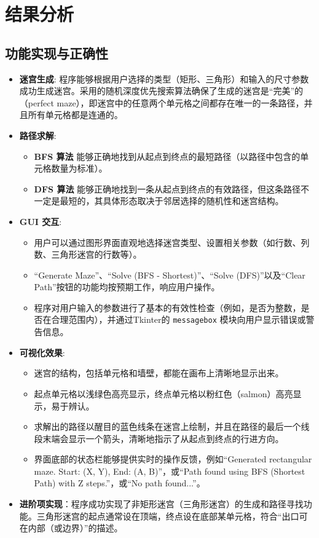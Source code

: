 \documentclass[UTF8]{report}
\theoremstyle{MyLineTheoremStyle} %
\theoremstyle{MyBlockTheoremStyle} %
\theoremstyle{MySubsubsectionStyle} %
\begin{document}
\section{结果分析}

\subsection{功能实现与正确性}
\begin{itemize}
    \item \textbf{迷宫生成}: 程序能够根据用户选择的类型（矩形、三角形）和输入的尺寸参数成功生成迷宫。采用的随机深度优先搜索算法确保了生成的迷宫是“完美”的（perfect maze），即迷宫中的任意两个单元格之间都存在唯一的一条路径，并且所有单元格都是连通的。
    \item \textbf{路径求解}:
    \begin{itemize}
        \item \textbf{BFS 算法} 能够正确地找到从起点到终点的最短路径（以路径中包含的单元格数量为标准）。
        \item \textbf{DFS 算法} 能够正确地找到一条从起点到终点的有效路径，但这条路径不一定是最短的，其具体形态取决于邻居选择的随机性和迷宫结构。
    \end{itemize}
    \item \textbf{GUI 交互}:
    \begin{itemize}
        \item 用户可以通过图形界面直观地选择迷宫类型、设置相关参数（如行数、列数、三角形迷宫的行数等）。
        \item “Generate Maze”、“Solve (BFS - Shortest)”、“Solve (DFS)”以及“Clear Path”按钮的功能均按预期工作，响应用户操作。
        \item 程序对用户输入的参数进行了基本的有效性检查（例如，是否为整数，是否在合理范围内），并通过Tkinter的 \texttt{messagebox} 模块向用户显示错误或警告信息。
    \end{itemize}
    \item \textbf{可视化效果}:
    \begin{itemize}
        \item 迷宫的结构，包括单元格和墙壁，都能在画布上清晰地显示出来。
        \item 起点单元格以浅绿色高亮显示，终点单元格以粉红色（salmon）高亮显示，易于辨认。
        \item 求解出的路径以醒目的蓝色线条在迷宫上绘制，并且在路径的最后一个线段末端会显示一个箭头，清晰地指示了从起点到终点的行进方向。
        \item 界面底部的状态栏能够提供实时的操作反馈，例如“Generated rectangular maze. Start: (X, Y), End: (A, B)”，或“Path found using BFS (Shortest Path) with Z steps.”，或“No path found...”。
    \end{itemize}
    \item \textbf{进阶项实现}：程序成功实现了非矩形迷宫（三角形迷宫）的生成和路径寻找功能。三角形迷宫的起点通常设在顶端，终点设在底部某单元格，符合“出口可在内部（或边界）”的描述。
\end{itemize}
\end{document}
